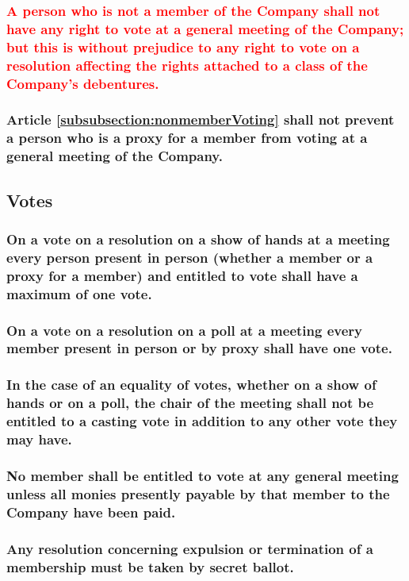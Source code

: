 \documentclass[12pt]{article}
\begin{document}
\subsubsection{\textcolor{red}{\label{subsubsection:nonmemberVoting}A person who is not a member of the Company shall not have any right to vote at a general meeting of the Company; but this is without prejudice to any right to vote on a resolution affecting the rights attached to a class of the Company’s debentures.}}
\subsubsection{Article \ref{subsubsection:nonmemberVoting} shall not prevent a person who is a proxy for a member from voting at a general meeting of the Company.}

\subsection{Votes}
\subsubsection{On a vote on a resolution on a show of hands at a meeting every person present in person (whether a member or a proxy for a member) and entitled to vote shall have a maximum of one vote.}
\subsubsection{On a vote on a resolution on a poll at a meeting every member present in person or by proxy shall have one vote.}
\subsubsection{In the case of an equality of votes, whether on a show of hands or on a poll, the chair of the meeting shall not be entitled to a casting vote in addition to any other vote they may have.}
\subsubsection{No member shall be entitled to vote at any general meeting unless all monies presently payable by that member to the Company have been paid.}
\subsubsection{Any resolution concerning expulsion or termination of a membership must be taken by secret ballot.}
\end{document}
